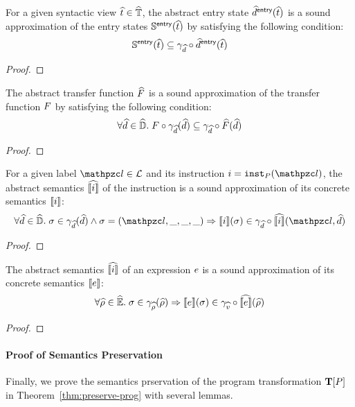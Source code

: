 \begin{lemma}\label{thm:sound-entryaelem}
  For a given syntactic view $\widehat{t} \in \widehat{\mathbb{T}}$, the abstract entry state
  $\widehat{d}^{\textsf{entry}}(\widehat{t})$ is a sound approximation of the entry states
  $\mathbb{S}^{\textsf{entry}}(\widehat{t})$ by satisfying the following condition:
  \[
    \mathbb{S}^{\textsf{entry}}(\widehat{t}) \subseteq \gamma_{\widehat{d}} \circ \widehat{d}^{\textsf{entry}}(\widehat{t}) 
  \]
\end{lemma}
\begin{proof}
  \todo
\end{proof}

\begin{lemma}\label{thm:sound-atransfer}
  The abstract transfer function $\widehat{F}$ is a sound approximation of the
  transfer function $F$ by satisfying the following condition:
  \[
    \forall \widehat{d} \in \widehat{\mathbb{D}}. \;
    F \circ \gamma_{\widehat{d}}(\widehat{d}) \subseteq
    \gamma_{\widehat{d}} \circ \widehat{F}(\widehat{d})
  \]
\end{lemma}
\begin{proof}
  \todo
\end{proof}

\begin{lemma}\label{thm:sound-inst}
  For a given label $\lab \in \labset$ and its instruction $\inst =
  \getinst{\prog}(\lab)$, the abstract semantics $\widehat{\llbracket{i}\rrbracket}$ of the
  instruction is a sound approximation of its concrete semantics $\llbracket{i}\rrbracket$:
  \[
    \forall \aelem \in \aelemset. \;
    \st \in \aelemgamma(\aelem) \wedge \st = (\lab, \_, \_, \_) \Rightarrow
    \sem{\inst}(\st) \in \aelemgamma \circ \asem{\inst}(\lab, \aelem)
  \]
\end{lemma}
\begin{proof}
  \todo
\end{proof}

\begin{lemma}\label{thm:sound-inst}
  The abstract semantics $\widehat{\llbracket{i}\rrbracket}$ of an expression $e$ is a sound
  approximation of its concrete semantics $\llbracket{e}\rrbracket$:
  \[
    \forall \widehat{\rho} \in \widehat{\mathbb{E}}. \;
    \sigma \in \gamma_{\widehat{\rho}}(\widehat{\rho}) \Rightarrow
    \llbracket{e}\rrbracket(\sigma) \in \gamma_{\widehat{v}} \circ \widehat{\llbracket{e}\rrbracket}(\widehat{\rho})
  \]
\end{lemma}
\begin{proof}
  \todo
\end{proof}

\paragraph{Proof of Semantics Preservation} Finally, we prove the semantics
prservation of the program transformation $\textbf{T}[P]$ in
Theorem~\ref{thm:preserve-prog} with several lemmas.

